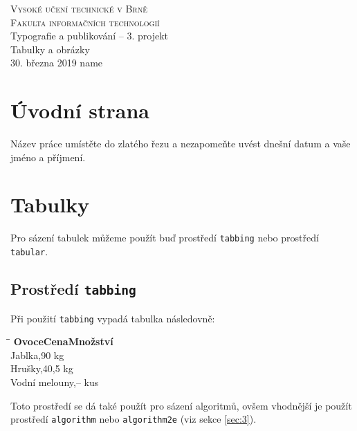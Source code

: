 \documentclass[a4paper, 11pt]{article}
\begin{document}
\begin{titlepage}
    \begin{center}
        \textsc{\Huge Vysoké učení technické v Brně \\[3.5mm] \huge Fakulta informačních technologií}\\
        {\LARGE Typografie a publikování -- 3. projekt\\
        \huge Tabulky a obrázky\\}
        \Large 30. března 2019 \hfill name
    \end{center}
\end{titlepage}

\section{Úvodní strana}

Název práce umístěte do zlatého řezu a nezapomeňte uvést dnešní datum a vaše jméno a příjmení.

\section{Tabulky}

Pro sázení tabulek můžeme použít buď prostředí \texttt{tabbing} nebo prostředí \texttt{tabular}.

\subsection{Prostředí \texttt{tabbing}}
Při použití \texttt{tabbing} vypadá tabulka následovně:

\begin{tabbing}
    \hspace*{3cm}\=\hspace{1.5cm}\= \kill
    \textbf{Ovoce}\>\textbf{Cena}\>\textbf{Množství}\\
    Jablka,90 kg\\
    Hrušky,40,5 kg\\
    Vodní melouny,-- kus\\
\end{tabbing}

{\noindent Toto prostředí se dá také použít pro sázení algoritmů, ovšem vhodnější je použít prostředí \verb|algorithm| nebo \verb|algorithm2e| (viz sekce \ref{sec:3}).}
\end{document}
